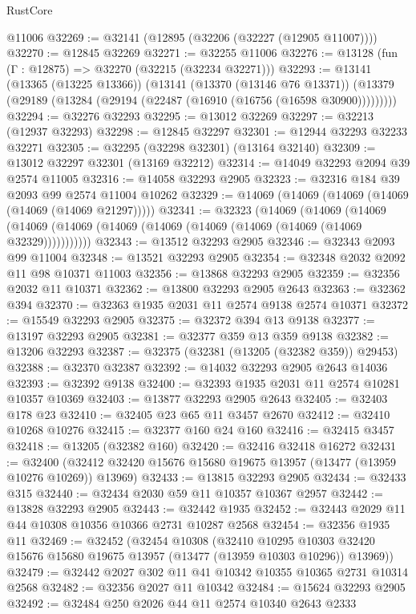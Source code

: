 \begin{lexlean}{RustCore}
\begin{coremodule}
    @11006
@32269 := @32141 (@12895 (@32206 (@32227 (@12905 @11007))))
@32270 := @12845 @32269
@32271 := @32255 @11006
@32276 := @13128 (fun (Γ : @12875) => @32270 (@32215 (@32234 @32271)))
@32293 := @13141
    (@13365 (@13225 @13366))
    (@13141
      (@13370 (@13146 @76 @13371))
      (@13379 (@29189 (@13284 (@29194 (@22487 (@16910 (@16756 (@16598 @30900)))))))))
@32294 := @32276 @32293
@32295 := @13012 @32269
@32297 := @32213 (@12937 @32293)
@32298 := @12845 @32297
@32301 := @12944 @32293 @32233 @32271
@32305 := @32295 (@32298 @32301) (@13164 @32140)
@32309 := @13012 @32297 @32301 (@13169 @32212)
@32314 := @14049 @32293 @2094 @39 @2574 @11005
@32316 := @14058 @32293 @2905
@32323 := @32316 @184 @39 @2093 @99 @2574 @11004 @10262
@32329 := @14069 (@14069 (@14069 (@14069 (@14069 (@14069 @21297)))))
@32341 := @32323
    (@14069
      (@14069
        (@14069 (@14069 (@14069 (@14069 (@14069 (@14069 (@14069 (@14069 (@14069 @32329)))))))))))
@32343 := @13512 @32293 @2905
@32346 := @32343 @2093 @99 @11004
@32348 := @13521 @32293 @2905
@32354 := @32348 @2032 @2092 @11 @98 @10371 @11003
@32356 := @13868 @32293 @2905
@32359 := @32356 @2032 @11 @10371
@32362 := @13800 @32293 @2905 @2643
@32363 := @32362 @394
@32370 := @32363 @1935 @2031 @11 @2574 @9138 @2574 @10371
@32372 := @15549 @32293 @2905
@32375 := @32372 @394 @13 @9138
@32377 := @13197 @32293 @2905
@32381 := @32377 @359 @13 @359 @9138
@32382 := @13206 @32293
@32387 := @32375 (@32381 (@13205 (@32382 @359)) @29453)
@32388 := @32370 @32387
@32392 := @14032 @32293 @2905 @2643 @14036
@32393 := @32392 @9138
@32400 := @32393 @1935 @2031 @11 @2574 @10281 @10357 @10369
@32403 := @13877 @32293 @2905 @2643
@32405 := @32403 @178 @23
@32410 := @32405 @23 @65 @11 @3457 @2670
@32412 := @32410 @10268 @10276
@32415 := @32377 @160 @24 @160
@32416 := @32415 @3457
@32418 := @13205 (@32382 @160)
@32420 := @32416 @32418 @16272
@32431 := @32400 (@32412 @32420 @15676 @15680 @19675 @13957 (@13477 (@13959 @10276 @10269)) @13969)
@32433 := @13815 @32293 @2905
@32434 := @32433 @315
@32440 := @32434 @2030 @59 @11 @10357 @10367 @2957
@32442 := @13828 @32293 @2905
@32443 := @32442 @1935
@32452 := @32443 @2029 @11 @44 @10308 @10356 @10366 @2731 @10287 @2568
@32454 := @32356 @1935 @11
@32469 := @32452
    (@32454
      @10308
      (@32410
        @10295
        @10303
        @32420
        @15676
        @15680
        @19675
        @13957
        (@13477 (@13959 @10303 @10296))
        @13969))
@32479 := @32442 @2027 @302 @11 @41 @10342 @10355 @10365 @2731 @10314 @2568
@32482 := @32356 @2027 @11 @10342
@32484 := @15624 @32293 @2905
@32492 := @32484 @250 @2026 @44 @11 @2574 @10340 @2643 @2333

\end{coremodule}
\end{lexlean}
